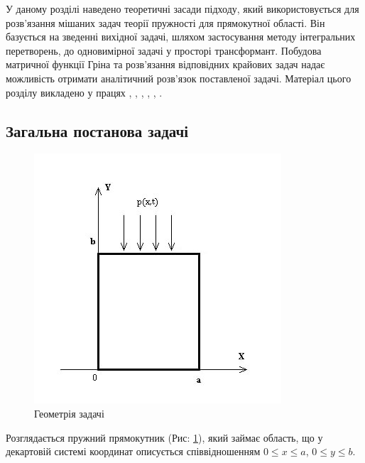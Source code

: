 У даному розділі наведено теоретичні засади підходу, який використовується для розв'язання мішаних задач теорії пружності для прямокутної області.
Він базується на зведенні вихідної задачі, шляхом застосування методу інтегральних перетворень, до одновимірної задачі у просторі трансформант.
Побудова матричної функції Гріна та розв'язання відповідних крайових задач надає можливість отримати аналітичний розв'язок поставленої задачі.
Матеріал цього розділу викладено у працях
\cite{pozhylenkov_1}, \cite{pozhylenkov_2}, \cite{pozhylenkov_3}, \cite{pozhylenkov_4}, \cite{pozhylenkov_5}, \cite{pozhylenkov_6}.

\subsection{Загальна постанова задачі}
\begin{figure}[h]
    \begin{center}
        \includegraphics[scale=1]{images/geometry/image_4.jpg}
    \end{center}
    \caption{Геометрія задачі}\label{geom_gen}
\end{figure}
Розглядається пружний прямокутник (Рис: \ref{geom_gen}), який займає область, що у декартовій системі координат описується співвідношенням $0 \le x \le a$, $0 \le y \le b$.

